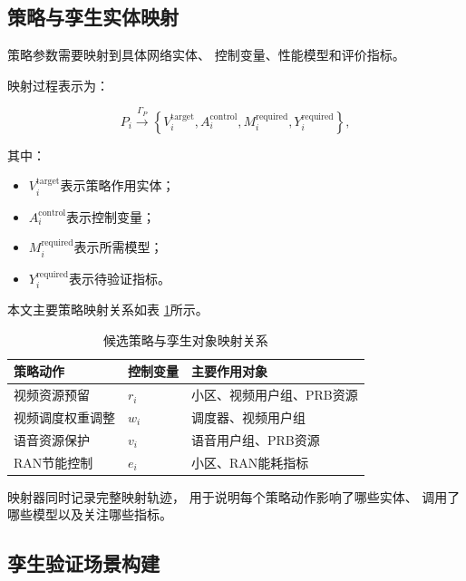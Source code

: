 \documentclass[lang=cn,12pt]{elegantbook}
\begin{document}
\subsection*{策略与孪生实体映射}

策略参数需要映射到具体网络实体、
控制变量、性能模型和评价指标。

映射过程表示为：

\begin{equation}
P_i
\xrightarrow{\Gamma_{P}}
\left\{
V_i^{\mathrm{target}},
A_i^{\mathrm{control}},
M_i^{\mathrm{required}},
Y_i^{\mathrm{required}}
\right\},
\label{eq:policy_entity_model_mapping}
\end{equation}

其中：

\begin{itemize}
    \item $V_i^{\mathrm{target}}$表示策略作用实体；
    \item $A_i^{\mathrm{control}}$表示控制变量；
    \item $M_i^{\mathrm{required}}$表示所需模型；
    \item $Y_i^{\mathrm{required}}$表示待验证指标。
\end{itemize}

本文主要策略映射关系如表
\ref{tab:twin_policy_mapping}所示。

\begin{table}[htbp]
    \centering
    \caption{候选策略与孪生对象映射关系}
    \label{tab:twin_policy_mapping}
    \begin{tabular}{p{}p{}p{}}
        \toprule
        策略动作 & 控制变量 & 主要作用对象 \\
        \midrule
        视频资源预留
        & $r_i$
        & 小区、视频用户组、PRB资源
        \\
        视频调度权重调整
        & $w_i$
        & 调度器、视频用户组
        \\
        语音资源保护
        & $v_i$
        & 语音用户组、PRB资源
        \\
        RAN节能控制
        & $e_i$
        & 小区、RAN能耗指标
        \\
        \bottomrule
    \end{tabular}
\end{table}

映射器同时记录完整映射轨迹，
用于说明每个策略动作影响了哪些实体、
调用了哪些模型以及关注哪些指标。


\subsection*{孪生验证场景构建}
\end{document}
